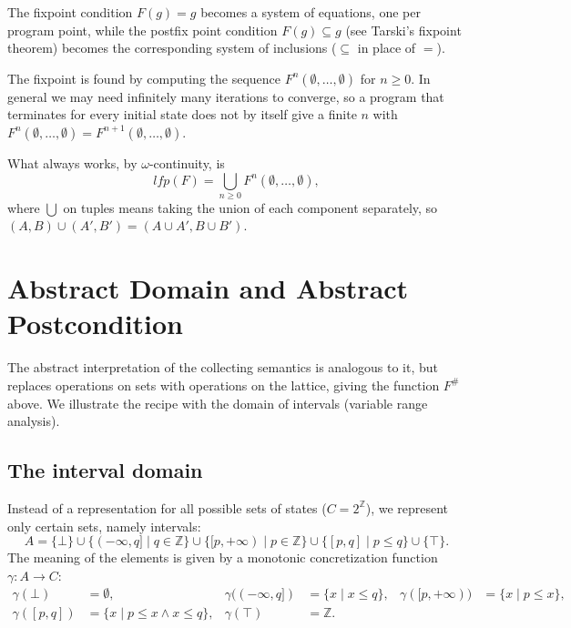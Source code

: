  
The fixpoint condition $F(g) = g$ becomes a system of equations, one per program point, while the postfix point condition $F(g) \subseteq g$ (see Tarski's fixpoint theorem) becomes the corresponding system of inclusions ($\subseteq$ in place of $=$).
 
The fixpoint is found by computing the sequence $F^n(\emptyset, \ldots, \emptyset)$ for $n \ge 0$. In general we may need infinitely many iterations to converge, so a program that terminates for every initial state does not by itself give a finite $n$ with $F^n(\emptyset, \ldots, \emptyset) = F^{n+1}(\emptyset, \ldots, \emptyset)$.
 
What always works, by $\omega$-continuity, is
\[
\mathit{lfp}(F) = \bigcup_{n \ge 0} F^n(\emptyset, \ldots, \emptyset),
\]
where $\bigcup$ on tuples means taking the union of each component separately, so $(A, B) \cup (A', B') = (A \cup A', B \cup B')$.
 
\section{Abstract Domain and Abstract Postcondition}
 
The abstract interpretation of the collecting semantics is analogous to it, but replaces operations on sets with operations on the lattice, giving the function $F^\#$ above. We illustrate the recipe with the domain of intervals (variable range analysis).
 
\subsection*{The interval domain}
 
Instead of a representation for all possible sets of states ($C = 2^{\mathbb{Z}}$), we represent only certain sets, namely intervals:
\[
A = \{\bot\} \cup \{(-\infty, q] \mid q \in \mathbb{Z}\} \cup \{[p, +\infty) \mid p \in \mathbb{Z}\} \cup \{[p, q] \mid p \le q\} \cup \{\top\}.
\]
The meaning of the elements is given by a monotonic concretization function $\gamma : A \to C$:
\begin{align*}
\gamma(\bot) &= \emptyset, & \gamma((-\infty, q]) &= \{x \mid x \le q\}, & \gamma([p, +\infty)) &= \{x \mid p \le x\},\\
\gamma([p, q]) &= \{x \mid p \le x \wedge x \le q\}, & \gamma(\top) &= \mathbb{Z}. &&
\end{align*}
 
